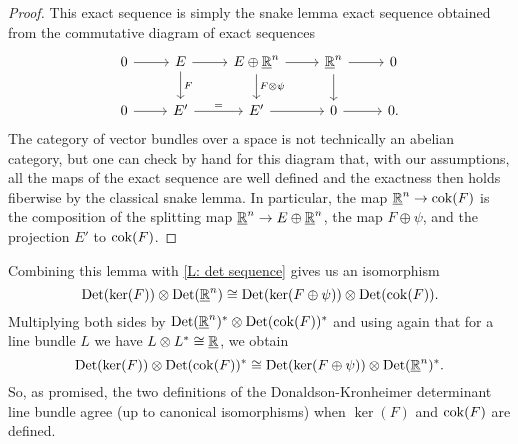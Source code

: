 \begin{proof}
	This exact sequence is simply the snake lemma exact sequence obtained from the commutative diagram of exact sequences
	\[
	\begin{tikzcd}
		0 \arrow[r] & E \arrow[r] \arrow[d, "F"] & E \oplus \underline{\R}^n \arrow[r] \arrow[d, "F \otimes \psi"] & \underline{\R}^n \arrow[r] \arrow[d] & 0 \\
		0 \arrow[r] & E' \arrow[r, "="] & E' \arrow[r] & 0 \arrow[r] & 0.
	\end{tikzcd}
	\]
	The category of vector bundles over a space is not technically an abelian category, but one can check by hand for this diagram that, with our assumptions, all the maps of the exact sequence are well defined and the exactness then holds fiberwise by the classical snake lemma.
	In particular, the map $\underline{\mathbb{R}}^n \to {\rm cok}(F)$ is the composition of the splitting map $\underline{\mathbb{R}}^n \to E \oplus \underline{\mathbb{R}}^n$, the map $F \oplus \psi$, and the projection $E'$ to ${\rm cok}(F)$.
\end{proof}

Combining this lemma with \cref{L: det sequence} gives us an isomorphism
$${\rm Det}(\ker(F)) \otimes {\rm Det}(\underline{\mathbb{R}}^n) \cong {\rm Det}(\ker(F \oplus \psi)) \otimes {\rm Det}({\rm cok}(F)).$$
Multiplying both sides by ${\rm Det}(\underline{\mathbb{R}}^n)^* \otimes {\rm Det}({\rm cok}(F))^*$ and using again that for a line bundle $L$ we have $L \otimes L^* \cong \underline{\mathbb{R}}$, we obtain
$${\rm Det}(\ker(F)) \otimes {\rm Det}({\rm cok}(F))^* \cong {\rm Det}(\ker(F \oplus \psi)) \otimes {\rm Det}(\underline{\mathbb{R}}^n)^*.$$
So, as promised, the two definitions of the Donaldson-Kronheimer determinant line bundle agree (up to canonical isomorphisms) when $\ker(F)$ and ${\rm cok}(F)$ are defined.

